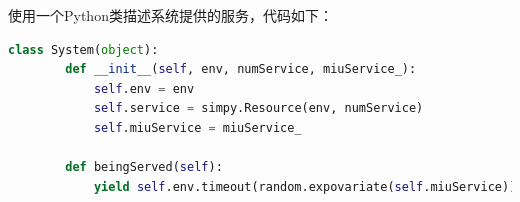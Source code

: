 






使用一个Python类描述系统提供的服务，代码如下：
\begin{lstlisting}[breaklines=true,language=Python]
    class System(object):
        def __init__(self, env, numService, miuService_):
            self.env = env
            self.service = simpy.Resource(env, numService)
            self.miuService = miuService_

        def beingServed(self):
            yield self.env.timeout(random.expovariate(self.miuService))
\end{lstlisting}


